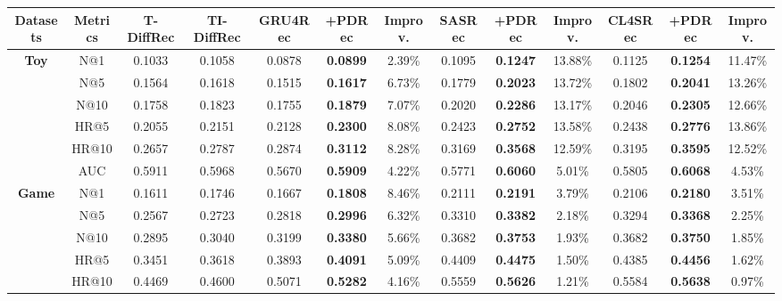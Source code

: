 \documentclass[letterpaper]{article} %
\begin{document}
\begin{table}[!t]
\centering
\renewcommand\arraystretch{1.1}
\tabcolsep=1.0mm
\small
\begin{tabular}{|c|c|cc|ccc|ccc|ccc|}
\hline
\textbf{Datasets}    & \textbf{Metrics} & \textbf{T-DiffRec} & \textbf{TI-DiffRec} & \textbf{GRU4Rec} & \textbf{+PDRec} & \textbf{Improv.} & \textbf{SASRec} & \textbf{+PDRec} & \textbf{Improv.} & \textbf{CL4SRec} & \textbf{+PDRec} & \textbf{Improv.} \\ \hline
\multirow{6}{*}{\textbf{Toy}}
    & N@1   & 0.1033 & 0.1058  & 0.0878 & \textbf{0.0899} & 2.39\% & 0.1095  & \textbf{0.1247} & 13.88\% & 0.1125  & \textbf{0.1254} & 11.47\% \\
    & N@5   & 0.1564 & 0.1618  & 0.1515 & \textbf{0.1617} & 6.73\% & 0.1779  & \textbf{0.2023} & 13.72\% & 0.1802 & \textbf{0.2041} & 13.26\% \\
    & N@10  & 0.1758 & 0.1823  & 0.1755 & \textbf{0.1879} & 7.07\% & 0.2020  & \textbf{0.2286} & 13.17\% & 0.2046 & \textbf{0.2305} & 12.66\% \\
    & HR@5  & 0.2055 & 0.2151  & 0.2128 & \textbf{0.2300} & 8.08\% & 0.2423  & \textbf{0.2752} & 13.58\% & 0.2438 & \textbf{0.2776} & 13.86\% \\
    & HR@10 & 0.2657 & 0.2787  & 0.2874 & \textbf{0.3112} & 8.28\% & 0.3169  & \textbf{0.3568} & 12.59\% & 0.3195 & \textbf{0.3595} & 12.52\% \\
    & AUC   & 0.5911 & 0.5968  & 0.5670 & \textbf{0.5909} & 4.22\% & 0.5771  & \textbf{0.6060} & 5.01\%  & 0.5805 & \textbf{0.6068} & 4.53\%  \\ \hline
\multirow{6}{*}{\textbf{Game}}
    & N@1   & 0.1611 & 0.1746 & 0.1667 & \textbf{0.1808} & 8.46\% & 0.2111 & \textbf{0.2191} & 3.79\%  & 0.2106 & \textbf{0.2180} & 3.51\%  \\
    & N@5   & 0.2567 & 0.2723 & 0.2818 & \textbf{0.2996} & 6.32\% & 0.3310 & \textbf{0.3382} & 2.18\%  & 0.3294 & \textbf{0.3368} & 2.25\%  \\
    & N@10  & 0.2895 & 0.3040 & 0.3199 & \textbf{0.3380} & 5.66\% & 0.3682 & \textbf{0.3753} & 1.93\%  & 0.3682 & \textbf{0.3750} & 1.85\%  \\
    & HR@5  & 0.3451 & 0.3618 & 0.3893 & \textbf{0.4091} & 5.09\% & 0.4409 & \textbf{0.4475} & 1.50\%  & 0.4385 & \textbf{0.4456} & 1.62\%  \\
    & HR@10 & 0.4469 & 0.4600 & 0.5071 & \textbf{0.5282} & 4.16\% & 0.5559 & \textbf{0.5626} & 1.21\%  & 0.5584 & \textbf{0.5638} & 0.97\%  \\

\end{tabular}
\end{table}
\end{document}
